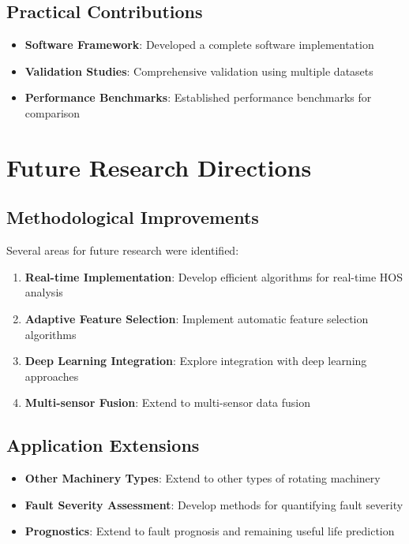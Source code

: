\subsection{Practical Contributions}

\begin{itemize}
    \item \textbf{Software Framework}: Developed a complete software implementation
    \item \textbf{Validation Studies}: Comprehensive validation using multiple datasets
    \item \textbf{Performance Benchmarks}: Established performance benchmarks for comparison
\end{itemize}

\section{Future Research Directions}

\subsection{Methodological Improvements}

Several areas for future research were identified:

\begin{enumerate}
    \item \textbf{Real-time Implementation}: Develop efficient algorithms for real-time HOS analysis
    \item \textbf{Adaptive Feature Selection}: Implement automatic feature selection algorithms
    \item \textbf{Deep Learning Integration}: Explore integration with deep learning approaches
    \item \textbf{Multi-sensor Fusion}: Extend to multi-sensor data fusion
\end{enumerate}

\subsection{Application Extensions}

\begin{itemize}
    \item \textbf{Other Machinery Types}: Extend to other types of rotating machinery
    \item \textbf{Fault Severity Assessment}: Develop methods for quantifying fault severity
    \item \textbf{Prognostics}: Extend to fault prognosis and remaining useful life prediction
\end{itemize}

